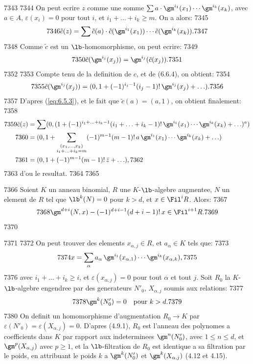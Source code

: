   7343	
  7344	On peut ecrire $z$ comme une somme $\sum a \cdot \gm^{i_1}(x_1) \cdots \gm^{i_k}(x_k)$, avec $a \in A$, $\varepsilon(x_i) = 0$ pour tout $i$, et $i_1 + \ldots + i_k \geqslant m$. On a alors:
  7345	\[
  7346	\tilde{c}(z) = \sum \tilde{c}(a) \cdot \tilde{c}(\gm^{i_1}(x_1)) \cdots \tilde{c}(\gm^{i_k}(x_k)).
  7347	\]
  7348	Comme $\tilde{c}$ est un $\lb$-homomorphisme, on peut ecrire:
  7349	\[
  7350	\tilde{c}(\gm^{i_j}(x_j)) = \gm^{i_j}(\tilde{c}(x_j)).
  7351	\]
  7352	
  7353	Compte tenu de la definition de $c$, et de (6.6.4), on obtient:
  7354	\[
  7355	\tilde{c}(\gm^{i_j}(x_j)) = (0, 1+(-1)^{i_j-1}(i_j-1)!\, \gm^{i_j}(x_j) + \ldots).
  7356	\]
  7357	D'apres (\ref{eq:6.5.3}), et le fait que $\tilde{c}(a) = (a, 1)$, on obtient finalement:
  7358	\begin{align*}
  7359	\tilde{c}(z) &= \sum (0, (1+(-1)^{i_1+\ldots+i_k-1}(i_1+\ldots+i_k-1)!\, \gm^{i_1}(x_1) \cdots \gm^{i_k}(x_k) + \ldots)^a) \\
  7360	&= (0, 1+\sum_{\substack{(x_1,\ldots,x_k)\\ i_1+\ldots+i_k=m}} (-1)^{m-1}(m-1)!\, a\, \gm^{i_1}(x_1) \cdots \gm^{i_k}(x_k) + \ldots) \\
  7361	&= (0, 1+(-1)^{m-1}(m-1)!\, \bar{z} + \ldots),
  7362	\end{align*}
  7363	d'ou le resultat.
  7364	
  7365	\begin{prop}
  7366	Soient $K$ un anneau binomial, $R$ une $K$-$\lb$-algebre augmentee, $N$ un element de $R$ tel que $\lb^k(N) = 0$ pour $k > d$, et $x \in \Fil^i R$. Alors:
  7367	\[
  7368	\gm^{d+i}(N, x) - (-1)^{d+i-1}(d+i-1)!\, x \in \Fil^{i+1} R.
  7369	\]
  7370	\end{prop}
  7371	
  7372	On peut trouver des elements $x_{\alpha, j} \in R$, et $a_\alpha \in K$ tels que:
  7373	\[
  7374	x = \sum_\alpha a_\alpha\, \gm^{i_1}(x_{\alpha,1}) \cdots \gm^{i_k}(x_{\alpha,k}),
  7375	\]
  7376	avec $i_1+\ldots+i_k \geqslant i$, et $\varepsilon(x_{\alpha,j}) = 0$ pour tout $\alpha$ et tout $j$. Soit $R_0$ la $K$-$\lb$-algebre engendree par des generateurs $N'_0$, $X_{\alpha,j}$ soumis aux relations:
  7377	\[
  7378	\gm^k(N'_0) = 0 \quad \text{pour } k > d.
  7379	\]
  7380	On definit un homomorphisme d'augmentation $R_0 \longrightarrow K$ par $\varepsilon(N'_0) = \varepsilon(X_{\alpha,j}) = 0$. D'apres (4.9.1), $R_0$ est l'anneau des polynomes a coefficients dans $K$ par rapport aux indeterminees $\gm^n(N'_0)$, avec $1 \leqslant n \leqslant d$, et $\gm^p(X_{\alpha,j})$ avec $p \geqslant 1$, et la $\lb$-filtration de $R_0$ est identique a sa filtration par le poids, en attribuant le poids $k$ a $\gm^k(N'_0)$ et $\gm^k(X_{\alpha,j})$ (4.12 et 4.15).
